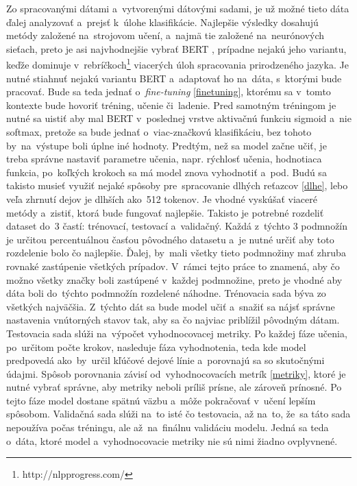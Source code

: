 Zo spracovanými dátami a~vytvorenými dátovými sadami, je už možné tieto dáta ďalej analyzovať a~prejsť k~úlohe klasifikácie. Najlepšie výsledky dosahujú metódy založené na~strojovom učení, a~najmä tie založené na~neurónových sieťach, preto je asi najvhodnejšie vybrať BERT \cite{Devlin:2018}, prípadne nejakú jeho variantu, keďže dominuje v~rebríčkoch\footnote{http://nlpprogress.com/} viacerých úloh spracovania prirodzeného jazyka. Je nutné stiahnuť nejakú variantu BERT a~adaptovať ho na~dáta, s~ktorými bude pracovať. Bude sa teda jednať o~\textit{fine-tuning} \ref{finetuning}, ktorému sa v~tomto kontexte bude hovoriť tréning, učenie či~ladenie. Pred samotným tréningom je nutné sa uistiť aby mal BERT v~poslednej vrstve aktivačnú funkciu sigmoid a~nie softmax, pretože sa bude jednať o~viac-značkovú klasifikáciu, bez tohoto by~na~výstupe boli úplne iné hodnoty. Predtým, než sa model začne učiť, je treba správne nastaviť parametre učenia, napr. rýchlosť učenia, hodnotiaca funkcia, po~koľkých krokoch sa má model znova vyhodnotiť a~pod. Budú sa takisto musieť využiť nejaké spôsoby pre~spracovanie dlhých reťazcov \ref{dlhe}, lebo veľa zhrnutí dejov je dlhších ako~512 tokenov. Je vhodné vyskúšať viaceré metódy a~zistiť, ktorá bude fungovať najlepšie. Takisto je potrebné rozdeliť dataset do~3 častí: trénovací, testovací a~validačný. Každá z~týchto 3 podmnožín je určitou percentuálnou časťou pôvodného datasetu a~je nutné určiť aby toto rozdelenie bolo čo najlepšie. Ďalej, by~mali všetky tieto podmnožiny mať zhruba rovnaké zastúpenie všetkých prípadov. V~rámci tejto práce to znamená, aby čo možno všetky značky boli zastúpené v~každej podmnožine, preto je vhodné aby dáta boli do~týchto podmnožín rozdelené náhodne. Trénovacia sada býva zo všetkých najväčšia. Z~týchto dát sa bude model učiť a~snažiť sa nájsť správne nastavenia vnútorných stavov tak, aby sa čo najviac priblížil pôvodným dátam. Testovacia sada slúži na~výpočet vyhodnocovacej metriky. Po každej fáze učenia, po~určitom počte krokov, nasleduje fáza vyhodnotenia, teda kde model predpovedá ako~by~určil kľúčové dejové línie a~porovnajú sa so skutočnými údajmi. Spôsob porovnania závisí od~vyhodnocovacích metrík \ref{metriky}, ktoré je nutné vybrať správne, aby metriky neboli príliš prísne, ale zároveň prínosné. Po tejto fáze model dostane spätnú väzbu a~môže pokračovať v~učení lepším spôsobom. Validačná sada slúži na~to isté čo testovacia, až na~to, že~sa táto sada nepoužíva počas tréningu, ale až~na~finálnu validáciu modelu. Jedná sa teda o~dáta, ktoré model  a~vyhodnocovacie metriky nie sú nimi žiadno ovplyvnené.

